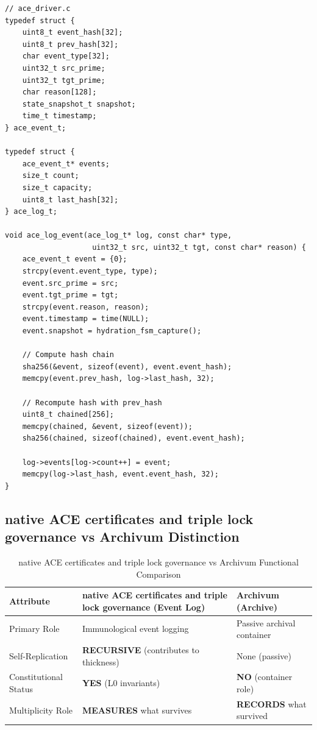 \documentclass[11pt,a4paper]{article}
\begin{document}
\begin{lstlisting}[caption={native ACE certificates and triple lock governance Driver Implementation}, label=lst:ace]
// ace_driver.c
typedef struct {
    uint8_t event_hash[32];
    uint8_t prev_hash[32];
    char event_type[32];
    uint32_t src_prime;
    uint32_t tgt_prime;
    char reason[128];
    state_snapshot_t snapshot;
    time_t timestamp;
} ace_event_t;

typedef struct {
    ace_event_t* events;
    size_t count;
    size_t capacity;
    uint8_t last_hash[32];
} ace_log_t;

void ace_log_event(ace_log_t* log, const char* type, 
                    uint32_t src, uint32_t tgt, const char* reason) {
    ace_event_t event = {0};
    strcpy(event.event_type, type);
    event.src_prime = src;
    event.tgt_prime = tgt;
    strcpy(event.reason, reason);
    event.timestamp = time(NULL);
    event.snapshot = hydration_fsm_capture();
    
    // Compute hash chain
    sha256(&event, sizeof(event), event.event_hash);
    memcpy(event.prev_hash, log->last_hash, 32);
    
    // Recompute hash with prev_hash
    uint8_t chained[256];
    memcpy(chained, &event, sizeof(event));
    sha256(chained, sizeof(chained), event.event_hash);
    
    log->events[log->count++] = event;
    memcpy(log->last_hash, event.event_hash, 32);
}
\end{lstlisting}

\subsection{native ACE certificates and triple lock governance vs Archivum Distinction}

\begin{table}[h]
\centering
\caption{native ACE certificates and triple lock governance vs Archivum Functional Comparison}
\label{tab:ace_archivum}
\begin{tabular}{@{}l l l@{}}
\toprule
\textbf{Attribute} & \textbf{native ACE certificates and triple lock governance (Event Log)} & \textbf{Archivum (Archive)} \\
\midrule
Primary Role & Immunological event logging & Passive archival container \\
Self-Replication & \textbf{RECURSIVE} (contributes to thickness) & None (passive) \\
Constitutional Status & \textbf{YES} (L0 invariants) & \textbf{NO} (container role) \\
Multiplicity Role & \textbf{MEASURES} what survives & \textbf{RECORDS} what survived \\
\bottomrule
\end{tabular}
\end{table}
\end{document}
